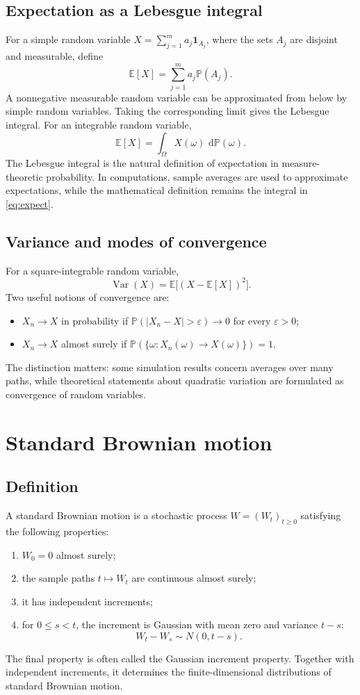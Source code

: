\documentclass[11pt,a4paper,oneside]{article}
\newcommand{\E}{\mathbb{E}}
\newcommand{\Prob}{\mathbb{P}}
\newcommand{\Om}{\Omega}
\newcommand{\dd}{\,\mathrm{d}}
\newcommand{\Var}{\operatorname{Var}}
\newcommand{\ind}{\mathbf{1}}
\begin{document}
\subsection{Expectation as a Lebesgue integral}
For a simple random variable $X=\sum_{j=1}^{m}a_j\ind_{A_j}$, where the sets $A_j$ are disjoint and measurable, define
\[
 \E[X]=\sum_{j=1}^{m}a_j\Prob(A_j).
\]
A nonnegative measurable random variable can be approximated from below by simple random variables. Taking the corresponding limit gives the Lebesgue integral. For an integrable random variable,
\begin{equation}\label{eq:expect}
 \E[X]=\int_{\Om}X(\omega)\,\dd\Prob(\omega).
\end{equation}
The Lebesgue integral is the natural definition of expectation in measure-theoretic probability. In computations, sample averages are used to approximate expectations, while the mathematical definition remains the integral in \cref{eq:expect}.

\subsection{Variance and modes of convergence}
For a square-integrable random variable,
\[
 \Var(X)=\E\bigl[(X-\E[X])^2\bigr].
\]
Two useful notions of convergence are:
\begin{itemize}
 \item $X_n\to X$ in probability if $\Prob(|X_n-X|>\varepsilon)\to0$ for every $\varepsilon>0$;
 \item $X_n\to X$ almost surely if $\Prob(\{\omega:X_n(\omega)\to X(\omega)\})=1$.
\end{itemize}
The distinction matters: some simulation results concern averages over many paths, while theoretical statements about quadratic variation are formulated as convergence of random variables.

\section{Standard Brownian motion}
\subsection{Definition}
A standard Brownian motion is a stochastic process $W=(W_t)_{t\geq0}$ satisfying the following properties:
\begin{enumerate}
 \item $W_0=0$ almost surely;
 \item the sample paths $t\mapsto W_t$ are continuous almost surely;
 \item it has independent increments;
 \item for $0\leq s<t$, the increment is Gaussian with mean zero and variance $t-s$:
 \begin{equation}\label{eq:increment}
   W_t-W_s\sim N(0,t-s).
 \end{equation}
\end{enumerate}
The final property is often called the Gaussian increment property. Together with independent increments, it determines the finite-dimensional distributions of standard Brownian motion.
\end{document}
